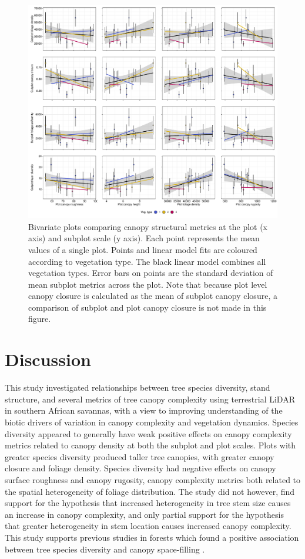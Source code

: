 \documentclass[11pt,a4paper]{article}
\begin{document}
\begin{figure}
	\includegraphics[width=\linewidth]{plot_subplot_bivar}
	\caption{Bivariate plots comparing canopy structural metrics at the plot (x axis) and subplot scale (y axis). Each point represents the mean values of a single plot. Points and linear model fits are coloured according to vegetation type. The black linear model combines all vegetation types. Error bars on points are the standard deviation of mean subplot metrics across the plot. Note that because plot level canopy closure is calculated as the mean of subplot canopy closure, a comparison of subplot and plot canopy closure is not made in this figure.}
	\label{plot_subplot_bivar}
\end{figure}

\section{Discussion}

This study investigated relationships between tree species diversity, stand structure, and several metrics of tree canopy complexity using terrestrial LiDAR in southern African savannas, with a view to improving understanding of the biotic drivers of variation in canopy complexity and vegetation dynamics. Species diversity appeared to generally have weak positive effects on canopy complexity metrics related to canopy density at both the subplot and plot scales. Plots with greater species diversity produced taller tree canopies, with greater canopy closure and foliage density. Species diversity had negative effects on canopy surface roughness and canopy rugosity, canopy complexity metrics both related to the spatial heterogeneity of foliage distribution. The study did not however, find support for the hypothesis that increased heterogeneity in tree stem size causes an increase in canopy complexity, and only partial support for the hypothesis that greater heterogeneity in stem location causes increased canopy complexity. This study supports previous studies in forests which found a positive association between tree species diversity and canopy space-filling \citep{Seidel2013, Shirima2015}.
\end{document}

